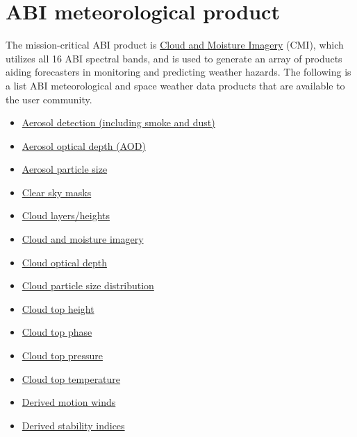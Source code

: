 \section{ABI meteorological product}
The mission-critical ABI product is \href{https://www.goes-r.gov/products/baseline-cloud-moisture-imagery.html}{Cloud and Moisture Imagery} (CMI), which utilizes all 16 ABI spectral bands,
and is used to generate an array of products aiding forecasters in monitoring and predicting weather hazards.
The following is a list ABI meteorological and space weather data products that are available to the user community.
\begin{itemize} 
\item \href{https://www.goes-r.gov/products/baseline-aerosol-detection.html}{Aerosol detection (including smoke and dust)} 
\item \href{https://www.goes-r.gov/products/baseline-aerosol-opt-depth.html}{Aerosol optical depth (AOD)}
\item \href{https://www.goes-r.gov/products/opt2-aerosol-particle-size.html}{Aerosol particle size}
\item \href{https://www.goes-r.gov/products/baseline-clear-sky-mask.html}{Clear sky masks}
\item \href{https://www.goes-r.gov/products/opt2-cloud-layers-height.html}{Cloud layers/heights}
\item \href{https://www.goes-r.gov/products/baseline-cloud-moisture-imagery.html}{Cloud and moisture imagery}
\item \href{https://www.goes-r.gov/products/baseline-cloud-opt-depth.html}{Cloud optical depth}
\item \href{https://www.goes-r.gov/products/baseline-cloud-particle-size-dist.html}{Cloud particle size distribution}
\item \href{https://www.goes-r.gov/products/baseline-cloud-top-height-cloud-layer.html}{Cloud top height} 
\item \href{https://www.goes-r.gov/products/baseline-cloud-phase.html}{Cloud top phase}
\item \href{https://www.goes-r.gov/products/baseline-cloud-top-pressure.html}{Cloud top pressure}
\item \href{https://www.goes-r.gov/products/baseline-cloud-top-temp.html}{Cloud top temperature}
\item \href{https://www.goes-r.gov/products/baseline-derived-motion-winds.html}{Derived motion winds}
\item \href{https://www.goes-r.gov/products/baseline-derived-stability-indices.html}{Derived stability indices}

\end{itemize}

